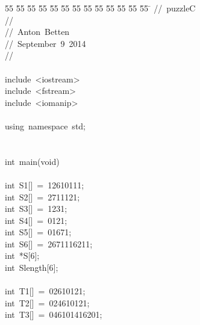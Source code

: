 %
%
\begin{tabbing}
55 \= 55 \= 55 \= 55 \= 55 \= 55 \= 55 \= 55 \= 55 \= 55 \= 55 \= 55 \= 55 \= \kill
//\ puzzleC\\[0pt]
//\\[0pt]
//\ Anton\ Betten\\[0pt]
//\ September\ 9\ 2014\\[0pt]
//\\[0pt]
\\[0pt]
include\ <iostream>\\[0pt]
include\ <fstream>\\[0pt]
include\ <iomanip>\\[0pt]
\\[0pt]
using\ namespace\ std;\\[0pt]
\\[0pt]
\\[0pt]
int\ main(void)\\[0pt]
\\[0pt]
\>int\ S1[]\ =\ 12610111;\\[0pt]
\>int\ S2[]\ =\ 2711121;\\[0pt]
\>int\ S3[]\ =\ 1231;\\[0pt]
\>int\ S4[]\ =\ 0121;\\[0pt]
\>int\ S5[]\ =\ 01671;\\[0pt]
\>int\ S6[]\ =\ 2671116211;\\[0pt]
\>int\ *S[6];\\[0pt]
\>int\ Slength[6];\\[0pt]
\\[0pt]
\>int\ T1[]\ =\ 02610121;\\[0pt]
\>int\ T2[]\ =\ 024610121;\\[0pt]
\>int\ T3[]\ =\ 046101416201;\\[0pt]

\end{tabbing}
